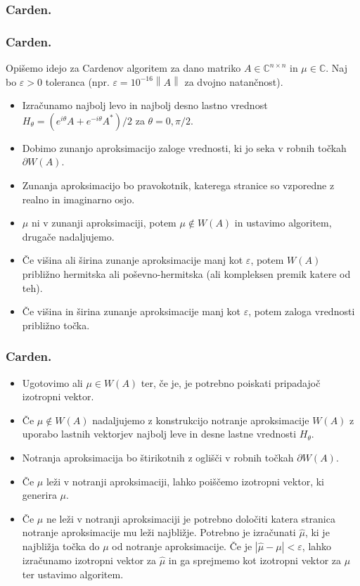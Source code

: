 \documentclass{beamer}
\newcommand{\abs}[1]{ \left\lvert#1\right\rvert}
\newcommand{\norm}[1]{\left\lVert#1\right\rVert}
\newcommand{\C}{\mathbb C}
\begin{document}
\subsubsection{Carden.}
\begin{frame}
\frametitle{Carden.}
Opišemo idejo za Cardenov algoritem za dano matriko $A \in \C^{n\times n}$ in $\mu \in \C$. Naj bo $\varepsilon >0$ toleranca (npr. $\varepsilon=10^{-16}\norm{A}$ za dvojno natančnost).\pause
\begin{itemize}
\item  Izračunamo najbolj levo in najbolj desno lastno vrednost $H_\theta =(e^{i\theta}A+e^{-i\theta}A^\ast)/2$ za $\theta =0,\pi/2$.
\item Dobimo zunanjo aproksimacijo zaloge vrednosti, ki jo seka v robnih točkah $\partial W(A)$.
\item Zunanja aproksimacijo bo pravokotnik, katerega stranice so vzporedne z realno in imaginarno osjo.
\item $\mu$ ni v zunanji aproksimaciji, potem $\mu \not \in W(A)$ in ustavimo algoritem, drugače nadaljujemo.
\item Če višina ali širina zunanje aproksimacije manj kot $\varepsilon$, potem $W(A)$ približno hermitska ali poševno-hermitska (ali kompleksen premik katere od teh). 
\item Če višina in širina zunanje aproksimacije manj kot $\varepsilon$, potem  zaloga vrednosti približno točka. 
\end{itemize}
\end{frame}
\begin{frame}
\frametitle{Carden.}
\begin{itemize}
\item Ugotovimo ali $\mu \in W(A)$ ter, če je, je potrebno poiskati pripadajoč izotropni vektor. 
\item Če $\mu \not \in W(A)$ nadaljujemo z konstrukcijo notranje aproksimacije $W(A)$ z uporabo lastnih vektorjev najbolj leve in desne lastne vrednosti $H_{\theta}$. 
\item Notranja aproksimacija bo štirikotnih z oglišči v robnih točkah $\partial W(A)$.
\item Če $\mu$ leži v notranji aproksimaciji, lahko poiščemo izotropni vektor, ki generira $\mu$.
\item Če $\mu$ ne leži v notranji aproksimaciji je potrebno določiti katera stranica notranje aproksimacije mu leži najbližje. Potrebno je izračunati $\hat{\mu}$, ki je najbližja točka do $\mu$ od notranje aproksimacije. Če je $\abs{\hat{\mu}-\mu}<\varepsilon$, lahko izračunamo izotropni vektor za $\hat{\mu}$ in ga sprejmemo kot izotropni vektor za $\mu$ ter ustavimo algoritem. 
\end{itemize}
\end{frame}
\end{document}
